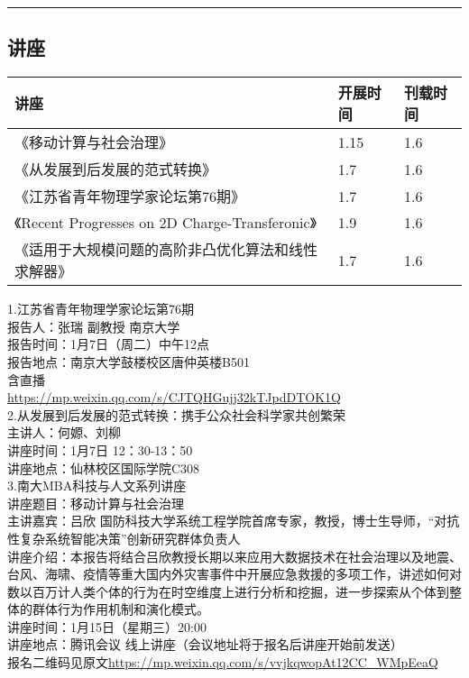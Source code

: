 \documentclass[letterpaper, 12pt]{article}
\begin{document}
\hrule
\pagebreak
\begin{multicols}{2}

\section{讲座}
\begin{tabularx}{0.5\textwidth}{|X|X|X|}
    \hline
    讲座 & 开展时间 & 刊载时间\\
    \hline\hline
    《移动计算与社会治理》 & 1.15 & 1.6\\\hline 
    《从发展到后发展的范式转换》 & 1.7 & 1.6\\\hline
    《江苏省青年物理学家论坛第76期》 & 1.7 & 1.6\\\hline
    《Recent Progresses on 2D Charge-Transferonic》 & 1.9 & 1.6\\\hline
    《适用于大规模问题的高阶非凸优化算法和线性求解器》 & 1.7 & 1.6\\\hline
\end{tabularx}

1.江苏省青年物理学家论坛第76期\\
报告人：张瑞 副教授 南京大学\\
报告时间：1月7日（周二）中午12点\\
报告地点：南京大学鼓楼校区唐仲英楼B501\\
含直播\\
\url{https://mp.weixin.qq.com/s/CJTQHGujj32kTJpdDTOK1Q}\\

2.从发展到后发展的范式转换：携手公众社会科学家共创繁荣\\
主讲人：何嫄、刘柳\\
讲座时间：1月7日 12：30-13：50\\
讲座地点：仙林校区国际学院C308\\

3.南大MBA科技与人文系列讲座\\
讲座题目：移动计算与社会治理\\
主讲嘉宾：吕欣 国防科技大学系统工程学院首席专家，教授，博士生导师，“对抗性复杂系统智能决策”创新研究群体负责人\\
讲座介绍：本报告将结合吕欣教授长期以来应用大数据技术在社会治理以及地震、台风、海啸、疫情等重大国内外灾害事件中开展应急救援的多项工作，讲述如何对数以百万计人类个体的行为在时空维度上进行分析和挖掘，进一步探索从个体到整体的群体行为作用机制和演化模式。\\
讲座时间：1月15日（星期三）20:00\\
讲座地点：腾讯会议 线上讲座（会议地址将于报名后讲座开始前发送）\\
报名二维码见原文\url{https://mp.weixin.qq.com/s/vvjkqwopAt12CC_WMpEeaQ}\\


\end{multicols}
\end{document}
